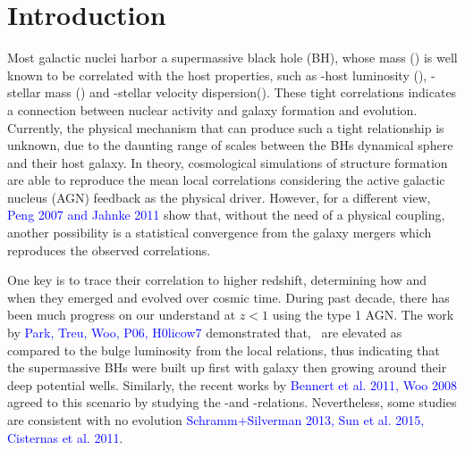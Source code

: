 \documentclass[apj]{emulateapj}
\begin{document}

\section{Introduction}
\label{sec:introduction}

Most galactic nuclei harbor a supermassive black hole (BH), whose mass (\mbh) is well known to be correlated with the host properties, such as \mbh-host luminosity (\lhost), \mbh- stellar mass (\smass)  and \mbh-stellar velocity dispersion(\sigstar). These tight correlations indicates a connection between nuclear activity and galaxy formation and evolution. 
Currently, the physical mechanism that can produce such a tight relationship is unknown, due to the daunting range of scales between the BHs dynamical sphere and their host galaxy. In theory, cosmological simulations of structure formation are able to reproduce the mean local correlations considering the active galactic nucleus (AGN) feedback as the physical driver. 
However, for a different view, \textcolor{blue}{Peng 2007 and Jahnke 2011} show that, without the need of a physical coupling, another possibility is a statistical convergence from the galaxy mergers which reproduces the observed correlations.

One key is to trace their correlation to higher redshift, determining how and when they emerged and evolved over cosmic time. During past decade, there has been much progress on our understand at $z<1$ using the type 1 AGN. The work by \textcolor{blue}{Park, Treu, Woo, P06, H0licow7} demonstrated that, \mbh\ are elevated as compared to the bulge luminosity from the local relations, thus indicating that the supermassive BHs were built up first with galaxy then growing around their deep potential wells. Similarly, the recent works by \textcolor{blue}{Bennert et al. 2011, Woo 2008} agreed to this scenario by studying the \mbh-\smass and \mbh-\sigstar relations. Nevertheless, some studies are consistent with no evolution \textcolor{blue}{Schramm+Silverman 2013, Sun et al. 2015, Cisternas et al. 2011}.
\end{document}
